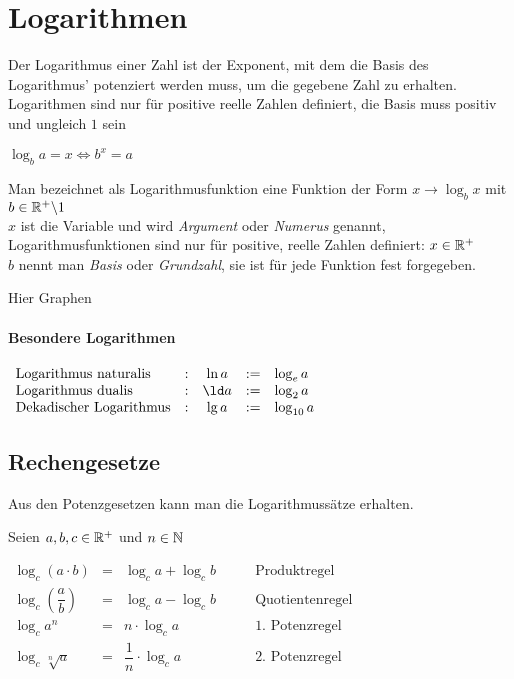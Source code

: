 \documentclass[main.tex]{subfiles}
\begin{document}
\chapter{Logarithmen}

\begin{Definition}
Der Logarithmus einer Zahl ist der Exponent, mit dem die Basis des Logarithmus' potenziert werden muss, um die gegebene Zahl zu erhalten. Logarithmen sind nur für positive reelle Zahlen definiert, die Basis muss positiv und ungleich $1$  sein
\begin{center}
$\log_ba=x\Leftrightarrow b^x=a$
\end{center}
\end{Definition}

\begin{Definition}
Man bezeichnet als Logarithmusfunktion eine Funktion der Form $x\rightarrow \log_bx$ mit $b\in \mathbb{R}^+\backslash 1$\\
$x$ ist die Variable und wird \textit{Argument} oder \textit{Numerus} genannt, Logarithmusfunktionen sind nur für positive, reelle Zahlen definiert: $x\in\mathbb{R}^+$\\
$b$ nennt man \textit{Basis} oder \textit{Grundzahl}, sie ist für jede Funktion fest forgegeben.\\
\end{Definition}

Hier Graphen
\subsubsection{Besondere Logarithmen}

$\begin{array}{lcccl}
\mbox{Logarithmus naturalis}&:&\ln a&:=&\log_ea\\
\mbox{Logarithmus dualis}&:&\ld a&:=&\log_2a\\
\mbox{Dekadischer Logarithmus}&:&\lg a&:=&\log_{10}a
\end{array}$
\\
	
			\section{Rechengesetze}

Aus den Potenzgesetzen kann man die Logarithmussätze erhalten.

\begin{Theorem}
Seien $a,b,c\in\mathbb{R}^+$ und $n\in\mathbb{N}$\\
\begin{center}
$\begin{array}{cccl}
\log_c(a\cdot b)&=&\log_ca+\log_cb&\qquad\mbox {Produktregel}\\
\log_c\left(\dfrac{a}{b}\right)&=&\log_ca-\log_cb&\qquad\mbox{Quotientenregel}\\
\log_ca^n&=&n\cdot\log_ca&\qquad\mbox{1. Potenzregel}\\
\log_c\sqrt[n]{a}&=&\dfrac{1}{n}\cdot\log_ca&\qquad\mbox{2. Potenzregel}\\
\end{array}$
\end{center}
\end{Theorem}
\end{document}
